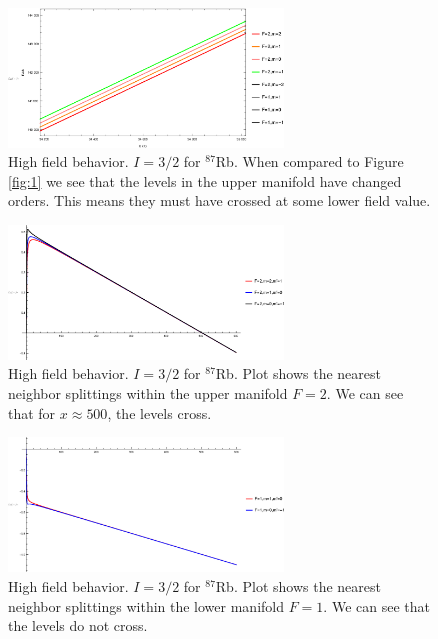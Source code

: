 \documentclass{article}
\theoremstyle{definition}
\begin{document}
\begin{enumerate}[label=(\alph*)]
	\begin{figure}[!htb]
		\centering
		\includegraphics[width=0.65\textwidth]{high-field-1.eps}
		\caption{High field behavior. $I=3/2$ for $^{87}$Rb. When compared to Figure \ref{fig:1} we see that the levels in the upper manifold have changed orders. This means they must have crossed at some lower field value.}
		\label{fig:3}
	\end{figure}
	
	
	\begin{figure}[!htb]
		\centering
		\includegraphics[width=0.65\textwidth]{high-field-2.eps}
		\caption{High field behavior. $I=3/2$ for $^{87}$Rb. Plot shows the nearest neighbor splittings within the upper manifold $F=2$. We can see that for $x\approx 500$, the levels cross. }
		\label{fig:4}
	\end{figure}
	
	
	\begin{figure}[!htb]
		\centering
		\includegraphics[width=0.65\textwidth]{high-field-3.eps}
		\caption{High field behavior. $I=3/2$ for $^{87}$Rb. Plot shows the nearest neighbor splittings within the lower manifold $F=1$. We can see that the levels do not cross.}
		\label{fig:5}
	\end{figure}
	

\end{enumerate}
\end{document}
